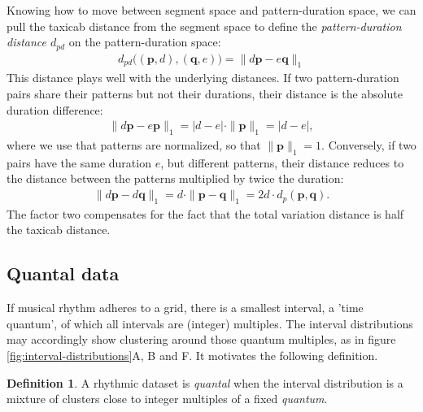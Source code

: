 \documentclass[a4paper]{article}
\newcommand{\vect}[1]{\mathbf{#1}}
\newcommand{\vp}{\vect p}
\newcommand{\vq}{\vect q}
\theoremstyle{definition}
\newtheorem{definition}{Definition}
\begin{document}
Knowing how to move between segment space and pattern-duration space, we can pull the taxicab distance from the segment space to define the \emph{pattern-duration distance $d_{pd}$} on the pattern-duration space:
\begin{align}
  d_{pd}\Big((\vp, d), (\vq, e)\Big)
  = \|d\vp - e\vq\|_1
\end{align}
This distance plays well with the underlying distances. If two pattern-duration pairs share their patterns but not their durations, their distance is the absolute duration difference:
\begin{align}
  \|d\vp - e\vp\|_1
  = |d-e| \cdot \|\vp\|_1
  = |d-e|,
\end{align}
where we use that patterns are normalized, so that $\|\vp\|_1=1$.
Conversely, if two pairs have the same duration $e$, but different patterns, their distance reduces to the distance between the patterns multiplied by twice the duration:
\begin{align}
  \|d \vp - d \vq\|_1
  = d \cdot \|\vp - \vq\|_1
  = 2d \cdot d_p(\vp, \vq).
\end{align}
The factor two compensates for the fact that the total variation distance is half the taxicab distance.


\subsection{Quantal data}

If musical rhythm adheres to a grid, there is a smallest interval, a 'time quantum', of which all intervals are (integer) multiples. The interval distributions may accordingly show clustering around those quantum multiples, as in figure \ref{fig:interval-distributions}A, B and F. It motivates the following definition.

\begin{definition}
  A rhythmic dataset is \emph{quantal} when the interval distribution is a mixture of clusters close to integer multiples of a fixed \emph{quantum}.
\end{definition}
\end{document}
